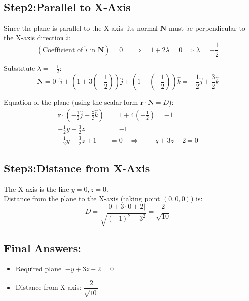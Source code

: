 \documentclass[journal]{IEEEtran}
\begin{document}
\subsection*{Step2:Parallel to X-Axis}

Since the plane is parallel to the X-axis, its normal $\mathbf{N}$ must be perpendicular to the X-axis direction $\hat{i}$:
\begin{equation}
( \text{Coefficient of } \hat{i} \text{ in } \mathbf{N} ) = 0 \quad \implies \quad 1 + 2\lambda = 0 \implies \lambda = -\frac{1}{2}
\label{eq:lambda}
\end{equation}

Substitute $\lambda = -\frac{1}{2}$:
\begin{equation}
\mathbf{N}= 0 \cdot \hat{i} + \left(1 + 3\left(-\frac{1}{2}\right)\right)\hat{j} + \left(1 - \left(-\frac{1}{2}\right)\right)\hat{k} 
= -\frac{1}{2}\hat{j} + \frac{3}{2}\hat{k}
\label{eq:normal_final}
\end{equation}

Equation of the plane (using the scalar form $\mathbf{r} \cdot \mathbf{N} = D$):
\begin{align}
\mathbf{r}  \cdot \left(-\frac{1}{2}\hat{j} + \frac{3}{2}\hat{k}\right) &= 1 + 4\left(-\frac{1}{2}\right) = -1 \\
-\frac{1}{2}y + \frac{3}{2}z &= -1 \label{eq:plane_eq1} \\
-\frac{1}{2}y + \frac{3}{2}z + 1 &= 0 \quad \Rightarrow \quad -y + 3z + 2 = 0 \label{eq:plane_eq2}
\end{align}

\subsection*{Step3:Distance from X-Axis}

The X-axis is the line $y=0, z=0$.\\
Distance from the plane to the X-axis (taking point $(0,0,0)$) is:
\begin{equation}
D = \frac{| -0 + 3 \cdot 0 + 2 |}{\sqrt{(-1)^2 + 3^2}} = \frac{2}{\sqrt{10}}
\label{eq:distance}
\end{equation}

\subsection*{Final Answers:}

\begin{itemize}
    \item Required plane: $-y + 3z + 2 = 0$ 
    \item Distance from X-axis: $\dfrac{2}{\sqrt{10}}$
\end{itemize}
\end{document}
